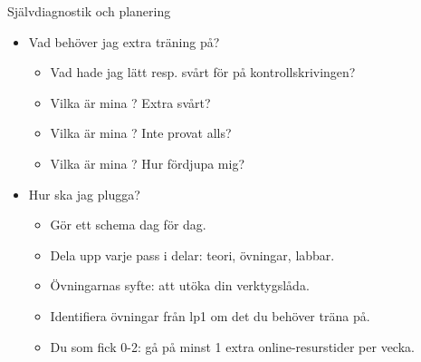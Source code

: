 %
%
%

\begin{Slide}{Självdiagnostik och planering}
\begin{itemize}
  \item Vad behöver jag extra träning på?
  \begin{itemize}
    \item Vad hade jag lätt resp. svårt för på kontrollskrivingen?
    \item Vilka är mina ? Extra svårt?
    \item Vilka är mina ? Inte provat alls?
    \item Vilka är mina ? Hur fördjupa mig?
  \end{itemize}
  \item Hur ska jag plugga?
  \begin{itemize}
    \item Gör ett schema dag för dag.
    \item Dela upp varje pass i delar: teori, övningar, labbar. 
    \item Övningarnas syfte: att utöka din verktygslåda.
    \item Identifiera övningar från lp1 om det du behöver träna på.
    \item Du som fick 0-2: gå på minst 1 extra online-resurstider per vecka.
  \end{itemize}
\end{itemize}
\end{Slide}

